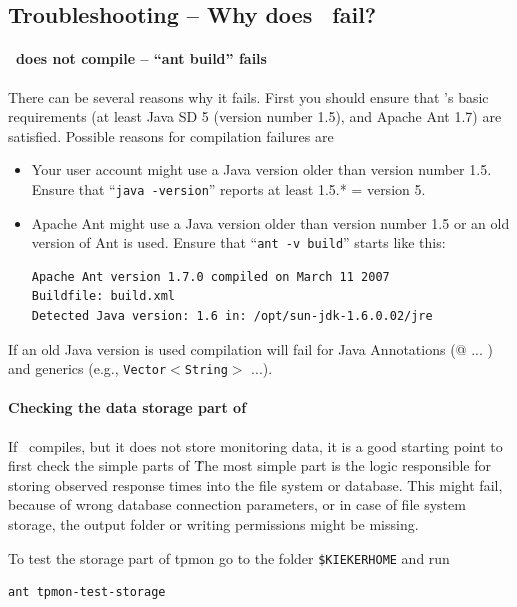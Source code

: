 \documentclass[a4paper,12pt]{scrartcl}
\begin{document}
\subsection{Troubleshooting -- Why does \tpmon\ fail?}
\paragraph{\tpmon\ does not compile -- ``ant build'' fails} There can be several reasons why it fails. First you should ensure that
\tpmon's basic requirements (at least Java SD 5 (version number 1.5), and Apache Ant 1.7) are satisfied. Possible reasons for compilation failures are
\begin{itemize}
 \item Your user account might use a Java version older than version number 1.5. Ensure that ``\texttt{java -version}'' reports at least 1.5.*  = version 5.
\item Apache Ant might use a Java version older than version number 1.5 or an old version of Ant is used. Ensure that ``\texttt{ant -v build}'' starts like this: \begin{lstlisting}[]
Apache Ant version 1.7.0 compiled on March 11 2007
Buildfile: build.xml
Detected Java version: 1.6 in: /opt/sun-jdk-1.6.0.02/jre
\end{lstlisting}
\end{itemize}

If an old Java version is used compilation will fail for Java Annotations (@ ... ) and generics (e.g., \texttt{Vector$<$String$>$} ...).


\paragraph{Checking the data storage part of \tpmon}
If \tpmon\ compiles, but it does not store monitoring data, it is a good
starting point to first check the simple parts of \tpmon\. The most simple
part is the logic responsible for storing observed response times into
the file system or database. This might fail, because of wrong
database connection parameters, or in case of file system storage,
the output folder or writing permissions might be missing.

To test the storage part of tpmon go to the folder \texttt{\$KIEKERHOME} and run
\begin{lstlisting}[caption={Testing the storage functionality},label={lst3}]
ant tpmon-test-storage
\end{lstlisting}
\end{document}
